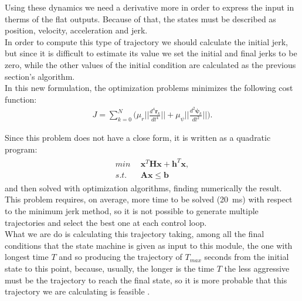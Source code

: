 Using these dynamics we need a derivative more in order to express the input in therms of the flat outputs.
Because of that, the states must be described as position, velocity, acceleration and jerk. \\
In order to compute this type of trajectory we should calculate the initial jerk, but since it is difficult to estimate its value we set the initial and final jerks to be zero, while the other values of the initial condition are calculated as the previous section's algorithm.\\

In this new formulation, the optimization problems minimizes the following cost function:
\begin{align}
J = \sum_{k=0}^N\Big( \mu_r \Big|\Big|\frac{d^{4}\boldsymbol{r}_k}{dt^{4}}\Big|\Big|  +  \mu_{\psi} \Big|\Big|\frac{d^{2}\boldsymbol{\psi}_k}{dt^{2}}\Big|\Big|\Big).
\end{align}

Since this problem does not have a close form, it is written as a quadratic program:
\begin{align}
\begin{split}
min & \ \ \boldsymbol{x}^T\boldsymbol{H}\boldsymbol{x} + \boldsymbol{h}^T\boldsymbol{x},\\[10pt]
s.t. &\ \ \boldsymbol{Ax} \leq \boldsymbol{b}
\end{split}
\end{align}
and then solved with optimization algorithms, finding numerically the result.\\ 

This problem requires, on average, more time to be solved (\SI{20}{\milli \second}) with respect to the minimum jerk method, so it is not possible to generate multiple trajectories and select the best one at each control loop.\\

What we are do is calculating this trajectory taking, among all the final conditions that the state machine is given as input to this module, the one with longest time $T$ and so producing the trajectory of $T_{max}$ seconds from the initial state to this point, because, usually, the longer is the time $T$ the less aggressive must be the trajectory to reach the final state, so it is more probable that this trajectory we are calculating is feasible .

